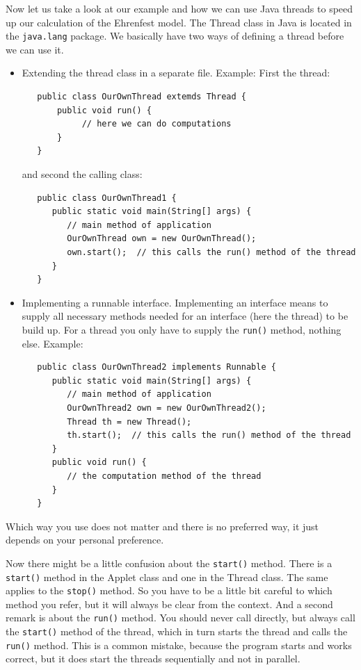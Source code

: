 Now let us take a look at our example and how we can use Java threads to
speed up our calculation of the Ehrenfest model. The Thread class in Java
is located in the \verb|java.lang| package. We basically have two 
ways of defining a thread before we can use it. 
\begin{itemize}
\item Extending the thread class in a separate file. Example:
First the thread:
\begin{small}
\begin{verbatim}
   public class OurOwnThread extemds Thread {       
       public void run() {
            // here we can do computations
       }
   }
\end{verbatim}
\end{small}
and second the calling class:
\begin{small}
\begin{verbatim}
   public class OurOwnThread1 {
      public static void main(String[] args) {
         // main method of application
         OurOwnThread own = new OurOwnThread();
         own.start();  // this calls the run() method of the thread
      }
   }       
\end{verbatim} 
\end{small}
\item Implementing a runnable interface. Implementing an interface means
  to supply all necessary methods needed for an interface (here the thread)
  to be build up. For a thread you only have to supply the \verb|run()| method,
  nothing else. Example:
\begin{small}
\begin{verbatim}
   public class OurOwnThread2 implements Runnable {
      public static void main(String[] args) {
         // main method of application
         OurOwnThread2 own = new OurOwnThread2();
         Thread th = new Thread();
         th.start();  // this calls the run() method of the thread
      }
      public void run() {
         // the computation method of the thread
      }
   }       
\end{verbatim}
\end{small}
\end{itemize}
Which way you use does not matter and there is no preferred way, it just
depends on your personal preference.

Now there might be a little confusion about the \verb|start()| method.
There is a \verb|start()| method in the Applet class and one in the Thread
class. The same applies to the \verb|stop()| method. So you have to be a little 
bit careful to which method you refer, but it will always be clear from
the context. And a second remark is about the \verb|run()| method. 
You should never call directly, but always call the  \verb|start()| method
of the thread, which in turn starts the thread and calls the \verb|run()| method.
This is a common mistake, because the program starts and works correct, but
it does start the threads sequentially and not in parallel. 

